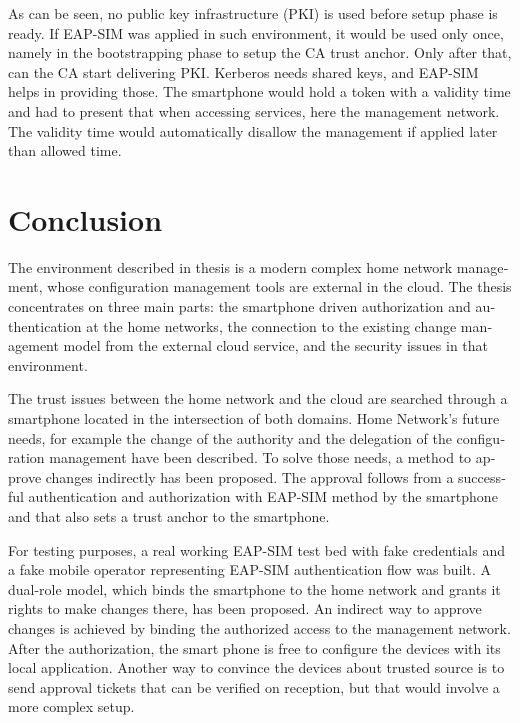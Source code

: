 \documentclass[12pt,a4paper,english]{tutthesis}
\begin{document}
\begin{otherlanguage}{english}
As can be seen, no public key infrastructure (PKI) is used before
setup phase is ready.  If EAP-SIM was applied in such environment, it
would be used only once, namely in the bootstrapping phase to setup
the CA trust anchor.  Only after that, can the CA start delivering
PKI. Kerberos needs shared keys, and EAP-SIM helps in providing those.
The smartphone would hold a token with a validity time and had to
present that when accessing services, here the management network. The
validity time would automatically disallow the management if applied
later than allowed time.

\chapter{Conclusion}
\label{sec-7}



The environment described in thesis is a modern complex home network
management, whose configuration management tools are external in the
cloud.  The thesis concentrates on three main parts:
the smartphone driven authorization and authentication at the home
networks, the connection to the existing change management model from
the external cloud service, and the security issues in that environment.

The trust issues between the home network and the cloud are searched
through a smartphone located in the intersection of both domains.
Home Network's future needs, for example the change of the authority
and the delegation of the configuration management have been
described.
To solve those needs, a method to approve changes indirectly has been
proposed. The approval follows from a successful authentication and
authorization with EAP-SIM method by the smartphone and that also sets
a trust anchor to the smartphone.


For testing purposes, a real working EAP-SIM test bed with fake credentials and
a fake mobile operator representing EAP-SIM authentication flow was
built. A dual-role model, which binds the smartphone to the home network and
grants it rights to make changes there, has been proposed.  
An indirect way to approve changes is achieved by binding the authorized
access to the management network. After the authorization, the smart
phone is free to configure the devices with its local application.
Another way to convince the
devices about trusted source is to send approval tickets that can
be verified on reception, but that would involve a more complex setup.


\end{otherlanguage}
\end{document}
